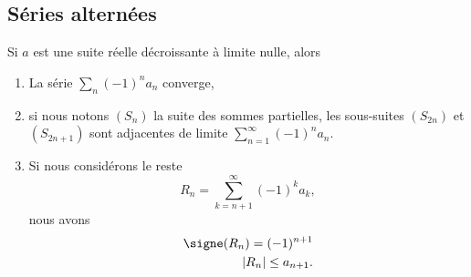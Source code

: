 \subsection{Séries alternées}

\begin{theorem}      \label{THOooOHANooHYfkII} 
    Si \( a\) est une suite réelle décroissante à limite nulle, alors
    \begin{enumerate}
        \item
            La série \( \sum_n(-1)^na_n\) converge,
        \item
            si nous notons \( (S_n)\) la suite des sommes partielles, les sous-suites \( (S_{2n})\) et \( (S_{2n+1})\) sont adjacentes de limite \( \sum_{n=1}^{\infty}(-1)^na_n\).
        \item
            Si nous considérons le reste 
            \begin{equation}
                R_n=\sum_{k=n+1}^{\infty}(-1)^ka_k,
            \end{equation}
            nous avons
            \begin{subequations}
                \begin{align}
                    \signe(R_n)=(-1)^{n+1}\\
                    | R_n |\leq a_{n+1}.
                \end{align}
            \end{subequations}
    \end{enumerate}
\end{theorem}

